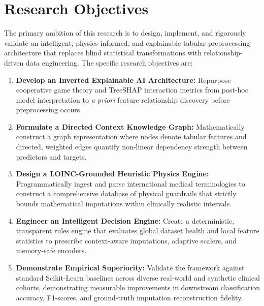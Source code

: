 \documentclass[MTech]{ugthesis}
\begin{document}
\section{Research Objectives}
The primary ambition of this research is to design, implement, and rigorously validate an intelligent, physics-informed, and explainable tabular preprocessing architecture that replaces blind statistical transformations with relationship-driven data engineering. The specific research objectives are:
\begin{enumerate}
    \item \textbf{Develop an Inverted Explainable AI Architecture:} Repurpose cooperative game theory and Tree\ac{SHAP} interaction metrics from post-hoc model interpretation to \textit{a priori} feature relationship discovery before preprocessing occurs.
    \item \textbf{Formulate a Directed Context Knowledge Graph:} Mathematically construct a graph representation where nodes denote tabular features and directed, weighted edges quantify non-linear dependency strength between predictors and targets.
    \item \textbf{Design a LOINC-Grounded Heuristic Physics Engine:} Programmatically ingest and parse international medical terminologies to construct a comprehensive database of physical guardrails that strictly bounds mathematical imputations within clinically realistic intervals.
    \item \textbf{Engineer an Intelligent Decision Engine:} Create a deterministic, transparent rules engine that evaluates global dataset health and local feature statistics to prescribe context-aware imputations, adaptive scalers, and memory-safe encoders.
    \item \textbf{Demonstrate Empirical Superiority:} Validate the framework against standard Scikit-Learn baselines across diverse real-world and synthetic clinical cohorts, demonstrating measurable improvements in downstream classification accuracy, F1-scores, and ground-truth imputation reconstruction fidelity.
\end{enumerate}
\end{document}
